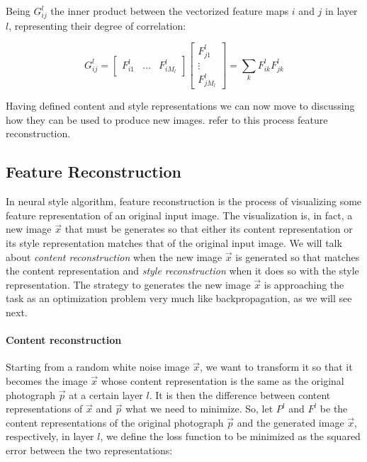 Being $G^l_{ij}$ the inner product between the vectorized feature maps $i$ and $j$ in layer $l$, representing their degree of correlation:

\begin{equation}
  G^l_{ij} =
  \begin{bmatrix}
    F^l_{i1} & \dots & F^l_{iM_l}
  \end{bmatrix}
  \begin{bmatrix}
    F^l_{j1} \\
    \vdots \\
    F^l_{jM_l}
  \end{bmatrix}
  = \sum_k F^l_{ik}F^l_{jk}
\end{equation}

Having defined content and style representations we can now move to discussing how they can be used to produce new images.
\citeauthor{Gatys2015B} refer to this process feature reconstruction.


\subsection{Feature Reconstruction}
\label{sub:system:method:reconstructions}

In neural style algorithm, feature reconstruction is the process of visualizing some feature representation of an original input image.
The visualization is, in fact, a new image $\vec{x}$ that must be generates so that either its content representation or its style representation matches that of the original input image.
We will talk about \emph{content reconstruction} when the new image $\vec{x}$ is generated so that matches the content representation and \emph{style reconstruction} when it does so with the style representation.
The strategy to generates the new image $\vec{x}$ is approaching the task as an optimization problem very much like backpropagation, as we will see next.

\paragraph{Content reconstruction}
Starting from a random white noise image $\vec{x}$, we want to transform it so that it becomes the image $\vec{x}$ whose content representation is the same as the original photograph $\vec{p}$ at a certain layer $l$.
It is then the difference between content representations of $\vec{x}$ and $\vec{p}$ what we need to minimize.
So, let $P^l$ and $F^l$ be the content representations of the original photograph $\vec{p}$ and the generated image $\vec{x}$, respectively, in layer $l$, we define the loss function to be minimized as the squared error between the two representations:

